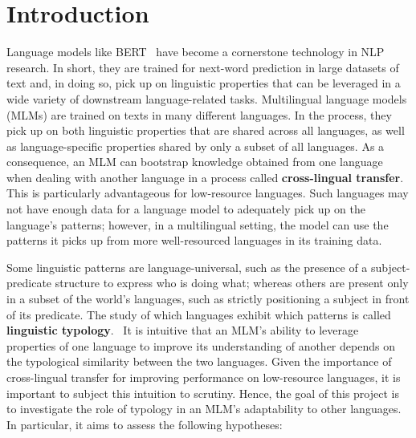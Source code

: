 
\section{Introduction}
\label{sec:introduction}
	Language models like BERT~\cite{devlin-etal-2019-bert} have become a cornerstone technology in NLP research. In short, they are trained for next-word prediction in large datasets of text and, in doing so, pick up on linguistic properties that can be leveraged in a wide variety of downstream language-related tasks. Multilingual language models (MLMs) are trained on texts in many different languages. In the process, they pick up on both linguistic properties that are shared across all languages, as well as language-specific properties shared by only a subset of all languages. As a consequence, an MLM can bootstrap knowledge obtained from one language when dealing with another language in a process called \textbf{cross-lingual transfer}. This is particularly advantageous for low-resource languages. Such languages may not have enough data for a language model to adequately pick up on the language's patterns; however, in a multilingual setting, the model can use the patterns it picks up from more well-resourced languages in its training data.

	Some linguistic patterns are language-universal, such as the presence of a subject-predicate structure to express who is doing what; whereas others are present only in a subset of the world's languages, such as strictly positioning a subject in front of its predicate. The study of which languages exhibit which patterns is called \textbf{linguistic typology}.~\cite{croft-2002-typology} It is intuitive that an MLM's ability to leverage properties of one language to improve its understanding of another depends on the typological similarity between the two languages. Given the importance of cross-lingual transfer for improving performance on low-resource languages, it is important to subject this intuition to scrutiny. Hence, the goal of this project is to investigate the role of typology in an MLM's adaptability to other languages. In particular, it aims to assess the following hypotheses:

